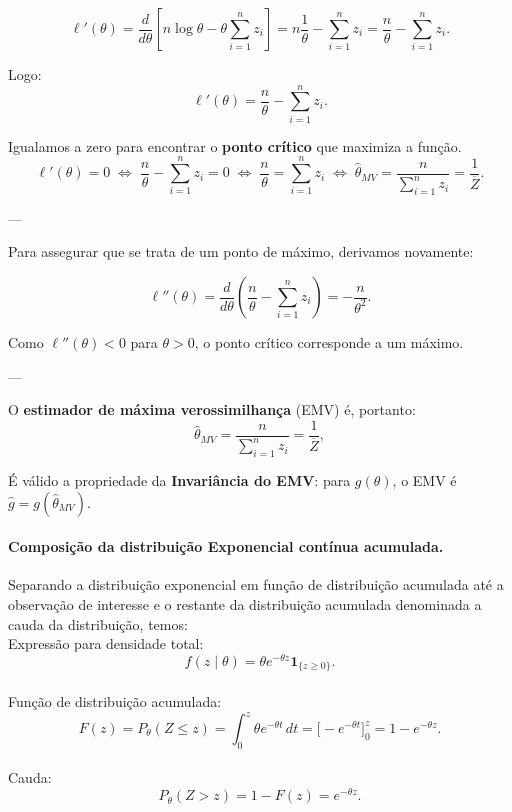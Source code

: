 \[
\ell'(\theta)
=\frac{d}{d\theta}[n\log\theta-\theta\sum_{i=1}^n z_i]
=n\frac{1}{\theta}-\sum_{i=1}^n z_i
=\frac{n}{\theta}-\sum_{i=1}^n z_i.
\]

Logo:
\[
\boxed{
\ell'(\theta)
=\frac{n}{\theta}-\sum_{i=1}^n z_i.}
\]

Igualamos a zero para encontrar o \textbf{ponto crítico} que maximiza a função. 
\[
\ell'(\theta)=0
\;\Longleftrightarrow\;
\frac{n}{\theta}-\sum_{i=1}^n z_i=0
\;\Longleftrightarrow\;
\frac{n}{\theta}=\sum_{i=1}^n z_i
\;\Longleftrightarrow\;
\widehat\theta_{MV}=\frac{n}{\sum_{i=1}^n z_i}
=\frac{1}{\overline Z}.
\]

---

Para assegurar que se trata de um ponto de máximo, derivamos novamente:

\[
\ell''(\theta)
=\frac{d}{d\theta}\!\left(\frac{n}{\theta}-\sum_{i=1}^n z_i\right)
=-\frac{n}{\theta^2}.
\]

Como $\ell''(\theta)<0$ para $\theta>0$,
o ponto crítico corresponde a um máximo.

---

O \textbf{estimador de máxima verossimilhança} (EMV) é, portanto:
\[
\boxed{\widehat\theta_{MV}=\frac{n}{\sum_{i=1}^n z_i}
=\frac{1}{\overline Z}},
\]

\medskip
É válido a propriedade da \textbf{Invariância do EMV}: para $g(\theta)$, o EMV é $\widehat g=g(\widehat\theta_{MV})$.

\paragraph{Composição da distribuição Exponencial contínua acumulada.}
\vspace{1em}
Separando a distribuição exponencial em função de distribuição acumulada até a observação de interesse e 
o restante da distribuição acumulada denominada a cauda da distribuição, temos:
 \\[1em]
Expressão para densidade total: \[f(z\mid\theta)=\theta e^{-\theta z}\mathbf 1_{\{z\ge0\}}.\] \\
Função de distribuição acumulada: \[F(z)=P_\theta(Z\le z)=\int_0^z \theta e^{-\theta t}\,dt
      =\big[-e^{-\theta t}\big]_0^z=1-e^{-\theta z}.\] \\
Cauda: \[P_\theta(Z>z)=1-F(z)=e^{-\theta z}.\]